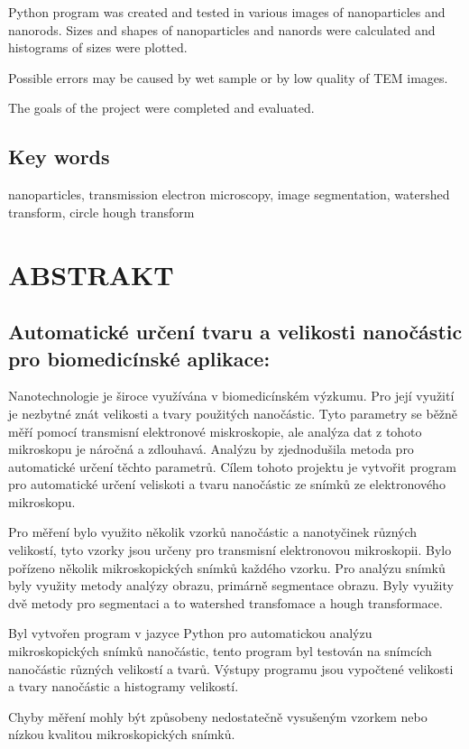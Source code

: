 \documentclass[a4paper,12pt]{article}   %
\numberwithin{equation}{section}        %
\newcommand{\nazev}{Automatické určení tvaru a velikosti nanočástic pro biomedicínské aplikace}
\begin{document}
       Python program was created and tested in various images of nanoparticles and nanorods. Sizes and shapes of nanoparticles and nanords were calculated and histograms of sizes were plotted.

       Possible errors may be caused by wet sample or by low quality of TEM images.

       The goals of the project were completed and evaluated.
    
	\subsection*{Key words}
		nanoparticles, transmission electron microscopy, image segmentation, watershed transform, circle hough transform
	\clearpage

	
	\null\vfill	
	\section*{ABSTRAKT}
        \subsection*{\nazev:}
    Nanotechnologie je široce využívána v biomedicínském výzkumu. Pro její využití je nezbytné znát velikosti a tvary použitých nanočástic. Tyto parametry se běžně měří pomocí transmisní elektronové miskroskopie, ale analýza dat z tohoto mikroskopu je náročná a zdlouhavá. Analýzu by zjednodušila metoda pro automatické určení těchto parametrů. Cílem tohoto projektu je vytvořit program pro automatické určení veliskoti a tvaru nanočástic ze snímků ze elektronového mikroskopu.

    Pro měření bylo využito několik vzorků nanočástic a nanotyčinek různých velikostí, tyto vzorky jsou určeny pro transmisní elektronovou mikroskopii. Bylo pořízeno několik mikroskopických snímků každého vzorku. Pro analýzu snímků byly využity metody analýzy obrazu, primárně segmentace obrazu. Byly využity dvě metody pro segmentaci a to watershed transfomace a hough transformace.

    Byl vytvořen program v jazyce Python pro automatickou analýzu mikroskopických snímků nanočástic, tento program byl testován na snímcích nanočástic různých velikostí a tvarů. Výstupy programu jsou vypočtené velikosti a tvary nanočástic a histogramy velikostí.

    Chyby měření mohly být způsobeny nedostatečně vysušeným vzorkem nebo nízkou kvalitou mikroskopických snímků.
\end{document}
